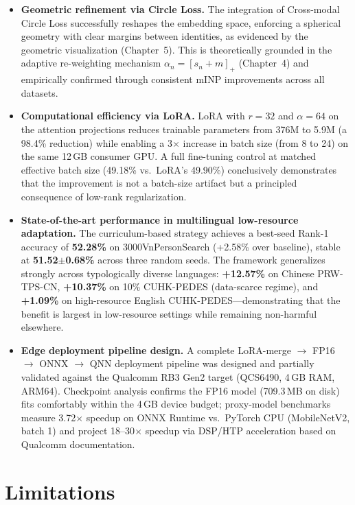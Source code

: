 \documentclass[../main.tex]{subfiles}
\begin{document}
\begin{itemize}
    \item \textbf{Geometric refinement via Circle Loss.} The integration of Cross-modal Circle Loss successfully reshapes the embedding space, enforcing a spherical geometry with clear margins between identities, as evidenced by the geometric visualization (Chapter~5). This is theoretically grounded in the adaptive re-weighting mechanism $\alpha_n = [s_n + m]_+$ (Chapter~4) and empirically confirmed through consistent mINP improvements across all datasets.

    \item \textbf{Computational efficiency via LoRA.} LoRA with $r{=}32$ and $\alpha{=}64$ on the attention projections reduces trainable parameters from 376M to 5.9M (a 98.4\% reduction) while enabling a 3$\times$ increase in batch size (from 8 to 24) on the same 12\,GB consumer GPU. A full fine-tuning control at matched effective batch size (49.18\% vs.\ LoRA's 49.90\%) conclusively demonstrates that the improvement is not a batch-size artifact but a principled consequence of low-rank regularization.

    \item \textbf{State-of-the-art performance in multilingual low-resource adaptation.} The curriculum-based strategy achieves a best-seed Rank-1 accuracy of \textbf{52.28\%} on 3000VnPersonSearch (+2.58\% over baseline), stable at \textbf{51.52$\pm$0.68\%} across three random seeds. The framework generalizes strongly across typologically diverse languages: \textbf{+12.57\%} on Chinese PRW-TPS-CN, \textbf{+10.37\%} on 10\% CUHK-PEDES (data-scarce regime), and \textbf{+1.09\%} on high-resource English CUHK-PEDES---demonstrating that the benefit is largest in low-resource settings while remaining non-harmful elsewhere.

    \item \textbf{Edge deployment pipeline design.} A complete LoRA-merge $\to$ FP16 $\to$ ONNX $\to$ QNN deployment pipeline was designed and partially validated against the Qualcomm RB3 Gen2 target (QCS6490, 4\,GB RAM, ARM64). Checkpoint analysis confirms the FP16 model (709.3\,MB on disk) fits comfortably within the 4\,GB device budget; proxy-model benchmarks measure 3.72$\times$ speedup on ONNX Runtime vs.\ PyTorch CPU (MobileNetV2, batch 1) and project 18--30$\times$ speedup via DSP/HTP acceleration based on Qualcomm documentation.
\end{itemize}

\section{Limitations}
\end{document}
